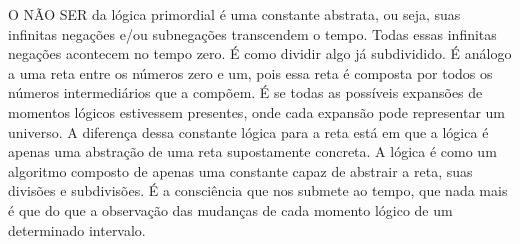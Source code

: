 O NÃO SER da lógica primordial é uma constante abstrata, ou seja, suas infinitas negações e/ou subnegações transcendem o tempo. Todas essas infinitas negações acontecem no tempo zero. É como dividir algo já subdividido. É análogo a uma reta entre os números zero e um, pois essa reta é composta por todos os números intermediários que a compõem. É se todas as possíveis expansões de momentos lógicos estivessem presentes, onde cada expansão pode representar um universo. A diferença dessa constante lógica para a reta está em que a lógica é apenas uma abstração de uma reta supostamente concreta. A lógica é como um algoritmo composto de apenas uma constante capaz de abstrair a reta, suas divisões e subdivisões. É a consciência que nos submete ao tempo, que nada mais é que do que a observação das mudanças de cada momento lógico de um determinado intervalo.